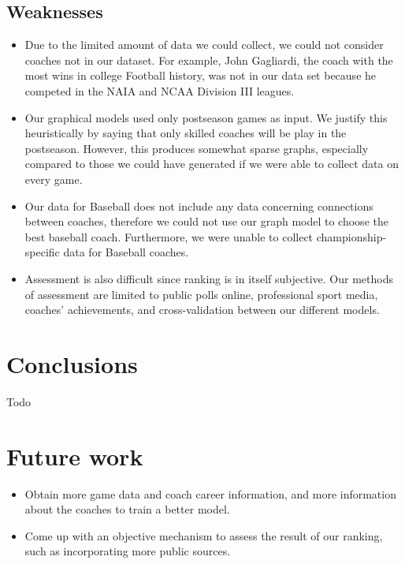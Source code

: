 \documentclass[titlepage]{article}
\begin{document}
\subsection{Weaknesses}
\begin{itemize}
\item Due to the limited amount of data we could collect, we could not consider coaches not in our dataset. For example, John Gagliardi, the coach with the most wins in college Football history, was not in our data set because he competed in the NAIA and NCAA Division III leagues. 

\item Our graphical models used only postseason games as input. We justify this heuristically by saying that only skilled coaches will be play in the postseason. However, this produces somewhat sparse graphs, especially compared to those we could have generated if we were able to collect data on every game.

\item Our data for Baseball does not include any data concerning connections between coaches, therefore we could not use our graph model to choose the best baseball coach. Furthermore, we were unable to collect championship-specific data for Baseball coaches.

\item Assessment is also difficult since ranking is in itself subjective. Our methods of assessment are limited to public polls online, professional sport media, coaches' achievements, and cross-validation between our different models.

\end{itemize}

\section{Conclusions}
Todo

\section{Future work}
\begin{itemize}
\item Obtain more game data and coach career information, and more information about the coaches to train a better model.

\item Come up with an objective mechanism to assess the result of our ranking, such as incorporating more public sources.
\end{itemize}
\end{document}
